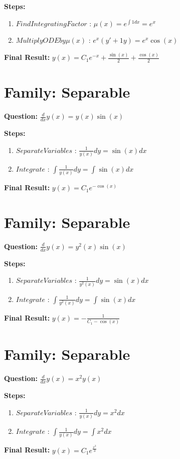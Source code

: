 \documentclass{article}
\begin{document}
\textbf{Steps:}
\begin{enumerate}
\item $Find Integrating Factor$ :  $\mu(x) = e^{\int 1 dx} = e^{x}$
\item $Multiply ODE by \mu(x)$ :  $e^{x}(y' + 1y) = e^{x} \cos{\left(x \right)}$
\end{enumerate}
\textbf{Final Result:} $y{\left(x \right)} = C_{1} e^{- x} + \frac{\sin{\left(x \right)}}{2} + \frac{\cos{\left(x \right)}}{2}$

\section*{Family: Separable}
\textbf{Question:} $\frac{d}{d x} y{\left(x \right)} = y{\left(x \right)} \sin{\left(x \right)}$

\textbf{Steps:}
\begin{enumerate}
\item $Separate Variables$ :  $\frac{1}{y{\left(x \right)}} dy = \sin{\left(x \right)} dx$
\item $Integrate$ :  $\int \frac{1}{y{\left(x \right)}} dy = \int \sin{\left(x \right)} dx$
\end{enumerate}
\textbf{Final Result:} $y{\left(x \right)} = C_{1} e^{- \cos{\left(x \right)}}$

\section*{Family: Separable}
\textbf{Question:} $\frac{d}{d x} y{\left(x \right)} = y^{2}{\left(x \right)} \sin{\left(x \right)}$

\textbf{Steps:}
\begin{enumerate}
\item $Separate Variables$ :  $\frac{1}{y^{2}{\left(x \right)}} dy = \sin{\left(x \right)} dx$
\item $Integrate$ :  $\int \frac{1}{y^{2}{\left(x \right)}} dy = \int \sin{\left(x \right)} dx$
\end{enumerate}
\textbf{Final Result:} $y{\left(x \right)} = - \frac{1}{C_{1} - \cos{\left(x \right)}}$

\section*{Family: Separable}
\textbf{Question:} $\frac{d}{d x} y{\left(x \right)} = x^{2} y{\left(x \right)}$

\textbf{Steps:}
\begin{enumerate}
\item $Separate Variables$ :  $\frac{1}{y{\left(x \right)}} dy = x^{2} dx$
\item $Integrate$ :  $\int \frac{1}{y{\left(x \right)}} dy = \int x^{2} dx$
\end{enumerate}
\textbf{Final Result:} $y{\left(x \right)} = C_{1} e^{\frac{x^{3}}{3}}$
\end{document}
